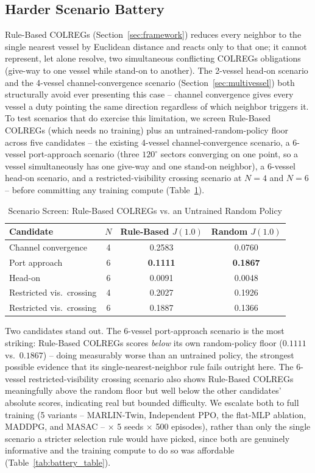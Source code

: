 \documentclass[journal,twocolumn,10pt]{IEEEtran}
\begin{document}
\subsection{Harder Scenario Battery}
\label{sec:harder-scenarios}
Rule-Based COLREGs (Section~\ref{sec:framework}) reduces every neighbor to the single nearest vessel by Euclidean distance and reacts only to that one; it cannot represent, let alone resolve, two simultaneous conflicting COLREGs obligations (give-way to one vessel while stand-on to another). The 2-vessel head-on scenario and the 4-vessel channel-convergence scenario (Section~\ref{sec:multivessel}) both structurally avoid ever presenting this case -- channel convergence gives every vessel a duty pointing the same direction regardless of which neighbor triggers it. To test scenarios that do exercise this limitation, we screen Rule-Based COLREGs (which needs no training) plus an untrained-random-policy floor across five candidates -- the existing 4-vessel channel-convergence scenario, a 6-vessel port-approach scenario (three $120^\circ$ sectors converging on one point, so a vessel simultaneously has one give-way and one stand-on neighbor), a 6-vessel head-on scenario, and a restricted-visibility crossing scenario at $N=4$ and $N=6$ -- before committing any training compute (Table~\ref{tab:screen_table}).

\begin{table}[h]
\caption{Scenario Screen: Rule-Based COLREGs vs. an Untrained Random Policy}
\label{tab:screen_table}
\centering
\begin{tabular}{lccc}
\toprule
\textbf{Candidate} & \textbf{$N$} & \textbf{Rule-Based $J(1.0)$} & \textbf{Random $J(1.0)$} \\
\midrule
Channel convergence & 4 & 0.2583 & 0.0760 \\
Port approach & 6 & \textbf{0.1111} & \textbf{0.1867} \\
Head-on & 6 & 0.0091 & 0.0048 \\
Restricted vis.\ crossing & 4 & 0.2027 & 0.1926 \\
Restricted vis.\ crossing & 6 & 0.1887 & 0.1366 \\
\bottomrule
\end{tabular}
\end{table}

Two candidates stand out. The 6-vessel port-approach scenario is the most striking: Rule-Based COLREGs scores \emph{below} its own random-policy floor ($0.1111$ vs.\ $0.1867$) -- doing measurably worse than an untrained policy, the strongest possible evidence that its single-nearest-neighbor rule fails outright here. The 6-vessel restricted-visibility crossing scenario also shows Rule-Based COLREGs meaningfully above the random floor but well below the other candidates' absolute scores, indicating real but bounded difficulty. We escalate both to full training (5 variants -- MARLIN-Twin, Independent PPO, the flat-MLP ablation, MADDPG, and MASAC -- $\times$ 5 seeds $\times$ 500 episodes), rather than only the single scenario a stricter selection rule would have picked, since both are genuinely informative and the training compute to do so was affordable (Table~\ref{tab:battery_table}).
\end{document}
